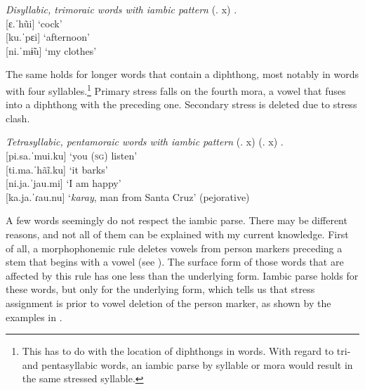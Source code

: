 \ea\label{ex:DisyllabicDiphthongIambs}
  \textit{Disyllabic, trimoraic words with iambic pattern} (. x) .\\
     {[}ɛ.ˈhũi] \tab ‘cock’\\
     {[}ku.ˈpɛi] \tab ‘afternoon’\\
     {[}ni.ˈmɨ̃u] \tab ‘my clothes’\\%
    \xe   
    
    
The same holds for longer words that contain a diphthong, most notably in words with four syllables.\footnote{This has to do with the location of diphthongs in words. With regard to tri- and pentasyllabic words, an iambic parse by syllable or mora would result in the same stressed syllable.} Primary stress falls on the fourth mora, a vowel that fuses into a diphthong with the preceding one. Secondary stress is deleted due to stress clash.

\ea\label{ex:TetraPenV}
 \textit{Tetrasyllabic, pentamoraic words with iambic pattern} (. x) (. x) .\\
    {[}pi.sa.ˈmui.ku] \tab ‘you (\textsc{sg}) listen’\\
    {[}ti.ma.ˈhãĩ.ku] \tab ‘it barks’\\
    {[}ni.ja.ˈjau.mi] \tab ‘I am happy’\\
     {[}ka.ja.ˈɾau.nu] \tab ‘\textit{karay}, man from Santa Cruz’ (pejorative)\\%
     \xe


A few words seemingly do not respect the iambic parse. There may be different reasons, and not all of them can be explained with my current knowledge. First of all, a morphophonemic rule deletes vowels from person markers preceding a stem that begins with a vowel (see ). The surface form of those words that are affected by this rule has one  less than the underlying form. Iambic parse holds for these words, but only for the underlying form, which tells us that stress assignment is prior to vowel deletion of the person marker, as shown by the examples in .

